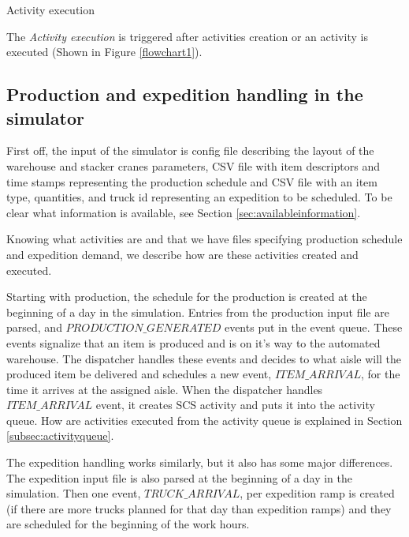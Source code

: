 \documentclass{ctuthesis}
\begin{document}
\begin{algorithm}[H]
\SetAlgoLined
{
}
\caption{Activity execution}
\label{alg:activityexec}
\end{algorithm}

The \emph{Activity execution} is triggered after activities creation or an activity is executed (Shown in Figure \ref{flowchart1}).


\subsection{Production and expedition handling in the simulator}

First off, the input of the simulator is config file describing the layout of the warehouse and stacker cranes parameters, CSV file with item descriptors and time stamps representing the production schedule and CSV file with an item type, quantities, and truck id representing an expedition to be scheduled. To be clear what information is available, see Section \ref{sec:availableinformation}.

Knowing what activities are and that we have files specifying production schedule and expedition demand, we describe how are these activities created and executed.

Starting with production, the schedule for the production is created at the beginning of a day in the simulation. Entries from the production input file are parsed, and $PRODUCTION\_GENERATED$ events put in the event queue. These events signalize that an item is produced and is on it's way to the automated warehouse. The dispatcher handles these events and decides to what aisle will the produced item be delivered and schedules a new event, $ITEM\_ARRIVAL$, for the time it arrives at the assigned aisle. When the dispatcher handles $ITEM\_ARRIVAL$ event, it creates SCS activity and puts it into the activity queue. How are activities executed from the activity queue is explained in Section \ref{subsec:activityqueue}.

The expedition handling works similarly, but it also has some major differences. The expedition input file is also parsed at the beginning of a day in the simulation. Then one event, $TRUCK\_ARRIVAL$, per expedition ramp is created (if there are more trucks planned for that day than expedition ramps) and they are scheduled for the beginning of the work hours. 
\end{document}
